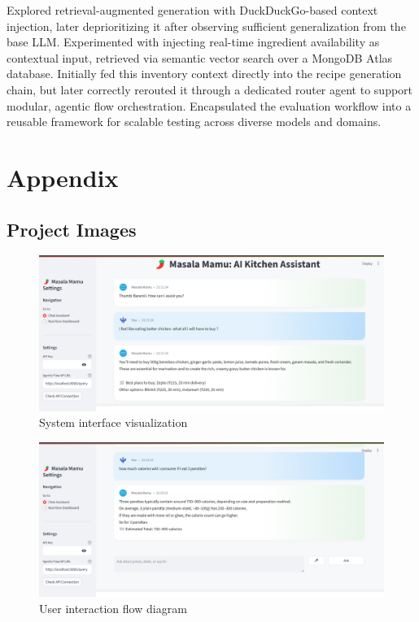 \documentclass{ecai}
\begin{document}
Explored retrieval-augmented generation with DuckDuckGo-based context injection, later deprioritizing it after observing sufficient generalization from the base LLM. Experimented with injecting real-time ingredient availability as contextual input, retrieved via semantic vector search over a MongoDB Atlas database. Initially fed this inventory context directly into the recipe generation chain, but later correctly rerouted it through a dedicated router agent to support modular, agentic flow orchestration. Encapsulated the evaluation workflow into a reusable framework for scalable testing across diverse models and domains.

\clearpage
\section*{Appendix}

\subsection*{Project Images}

\begin{figure}[!h]
\centering
\includegraphics[width=\columnwidth]{../images/img.png}
\caption{System interface visualization}
\end{figure}

\begin{figure}[!h]
\centering
\includegraphics[width=\columnwidth]{../images/img_1.png}
\caption{User interaction flow diagram}
\end{figure}
\end{document}
